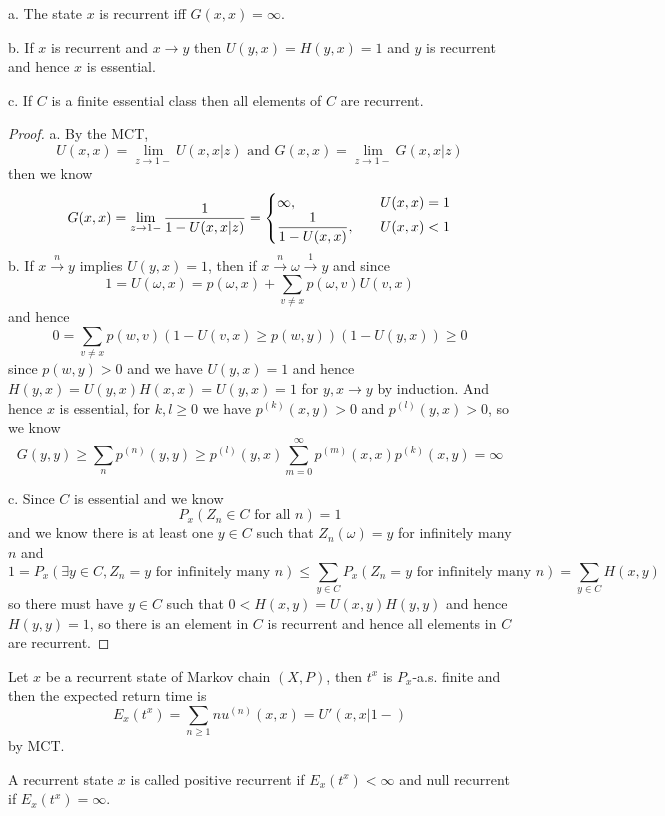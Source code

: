 \documentclass[lang=en, color=blue, ]{elegantbook}
\begin{document}
\begin{theorem}
    a. The state $x$ is recurrent iff $G(x,x) = \infty$.\par
    b. If $x$ is recurrent and $x\to y$ then $U(y,x) = H(y,x) = 1$ and $y$ is recurrent and hence $x$ is essential.\par
    c. If $C$ is a finite essential class then all elements of $C$ are recurrent.
\end{theorem}
\begin{proof}
    a. By the MCT,
    \[U(x,x) = \lim_{z\to 1-}U(x,x|z)\text{ and }G(x,x) = \lim_{z\to 1-}G(x,x|z)\]
    then we know
    \[
    G(x,x) = \lim_{z\to 1-} \dfrac{1}{1-U(x,x|z)} = \begin{cases}
        \infty,&U(x,x) = 1\par \\
        \dfrac{1}{1-U(x,x)},\quad&U(x,x)<1
    \end{cases}
    \]
    b. If $x\overset{n}{\rightarrow} y$ implies $U(y,x) = 1$, then if $x\overset{n}{\rightarrow} \omega \overset{1}{\rightarrow} y$ and since
    \[
    1 = U(\omega,x) = p(\omega,x) + \sum\limits_{v\neq x}p(\omega,v)U(v,x)
    \]
    and hence
    \[
    0 = \sum\limits_{v\neq x}p(w,v)(1-U(v,x) \geq p(w,y))(1-U(y,x)) \geq 0
    \]
    since $p(w,y) > 0$ and we have $U(y,x) = 1$ and hence $H(y,x) = U(y,x)H(x,x) = U(y,x) = 1$ for $y, x\to y$ by induction. And hence $x$ is essential, for $k,l \geq 0$ we have $p^{(k)}(x,y) > 0$ and $p^{(l)}(y,x) > 0$, so we know
    \[
    G(y,y) \geq \sum\limits_{n} p^{(n)}(y,y) \geq p^{(l)}(y,x) \sum\limits_{m=0}^{\infty}p^{(m)}(x,x)p^{(k)}(x,y) = \infty   \]\par
    c. Since $C$ is essential and we know
    \[P_x(Z_n \in C\text{ for all }n) = 1\]
    and we know there is at least one $y\in C$ such that $Z_n(\omega) = y$ for infinitely many $n$ and
    \[
    1 = P_x(\exists y \in C, Z_n = y\text{ for infinitely many }n) \leq \sum\limits_{y \in C}P_x(Z_n = y\text{ for infinitely many }n) = \sum\limits_{y\in C} H(x,y)
    \]
    so there must have $y\in C$ such that $0< H(x,y) = U(x,y)H(y,y)$ and hence $H(y,y) = 1$, so there is an element in $C$ is recurrent and hence all elements in $C$ are recurrent.
\end{proof}

\begin{definition}
    Let $x$ be a recurrent state of Markov chain $(X,P)$, then $t^x$ is $P_x$-a.s. finite and then the expected return time is
    \[E_x(t^x) = \sum_{n\geq 1}nu^{(n)}(x,x) = U'(x,x|1-)\]
    by MCT.\par
    A recurrent state $x$ is called positive recurrent if $E_x(t^x) < \infty$ and null recurrent if $E_x(t^x) = \infty$.
\end{definition}
\end{document}
